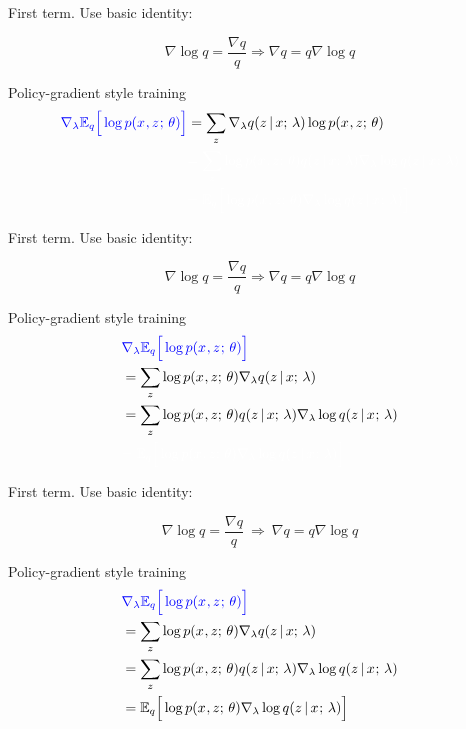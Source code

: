 \begin{frame}
First term. Use basic identity:

\[\nabla \log q = \frac{\nabla q}{q} \Rightarrow \nabla q  = q \nabla \log q \]

Policy-gradient style training \citep{Williams1992}
\begin{align*}
{\color{blue} \nabla_\lambda {\E_{ q}\Big[ \log p(x^{}, z^{} \param \theta) \Big]}}   &= \sum_z  \nabla_\lambda   q(z \given x \param \lambda )   \log p(x^{}, z \param \theta) \\ 
        &{\color{white}=  \sum_z  \log p(x^{}, z \param \theta)  q(z \given x \param \lambda )  \nabla_\lambda \log q(z \given x^{} \param \lambda) } \\ 
    &{\color{white} = \E_{q}\Big[ \log p(x^{}, z \param \theta) \nabla_\lambda \log q(z \given x^{} \param \lambda) \Big]}
\end{align*}
\end{frame}

\begin{frame}
First term. Use basic identity:

\[\nabla \log q = \frac{\nabla q}{q} \Rightarrow \nabla q  = q \nabla \log q \]

Policy-gradient style training \citep{Williams1992}
\begin{align*}
&{\color{blue} \nabla_\lambda {\E_{ q}\Big[ \log p(x^{}, z^{} \param \theta) \Big]}}\\
    &=  \sum_z  \log p(x^{}, z \param \theta) \nabla_\lambda   q(z \given x \param \lambda )  \\ 
        &=  \sum_z  \log p(x^{}, z \param \theta)  q(z \given x \param \lambda )  \nabla_\lambda \log q(z \given x^{} \param \lambda)  \\ 
        &{\color{white} = \E_{q}\Big[ \log p(x^{}, z \param \theta) \nabla_\lambda \log q(z \given x^{} \param \lambda) \Big]}
\end{align*}
\end{frame}

\begin{frame}
First term. Use basic identity:

\[\nabla \log q = \frac{\nabla q}{q}\ \Rightarrow\ \nabla q  = q \nabla \log q \]

Policy-gradient style training \citep{Williams1992}
\begin{align*}
&{\color{blue} \nabla_\lambda {\mathbb{E}_{ q}\Big[ \log p(x^{}, z^{} ; \,\theta) \Big]}}\\
    &=  \sum_z  \log p(x^{}, z ; \, \theta) \nabla_\lambda   q(z \,|\, x ; \, \lambda )  \\ 
        &=  \sum_z  \log p(x^{}, z ; \, \theta)  q(z \,|\, x ; \, \lambda )  \nabla_\lambda \log q(z \,|\, x^{} ; \, \lambda)  \\ 
    &= \mathbb{E}_{q}\Big[ \log p(x^{}, z ; \, \theta) \nabla_\lambda \log q(z \,|\, x^{} ; \, \lambda) \Big]
\end{align*}
\end{frame}


